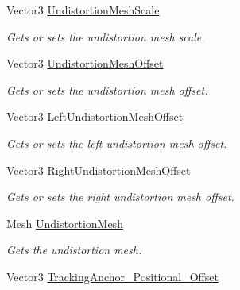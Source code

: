 \begin{DoxyCompactItemize}
Vector3 \mbox{\hyperlink{class_ximmerse_1_1_slide_in_s_d_k_1_1_override_a_r_setting_add01e612d5545552a7ac20c6e5a3d6d2}{Undistortion\+Mesh\+Scale}}
\begin{DoxyCompactList}\small\item\em Gets or sets the undistortion mesh scale. \end{DoxyCompactList}\item 
Vector3 \mbox{\hyperlink{class_ximmerse_1_1_slide_in_s_d_k_1_1_override_a_r_setting_a1272dfacf5297297d593c3b99c45382a}{Undistortion\+Mesh\+Offset}}
\begin{DoxyCompactList}\small\item\em Gets or sets the undistortion mesh offset. \end{DoxyCompactList}\item 
Vector3 \mbox{\hyperlink{class_ximmerse_1_1_slide_in_s_d_k_1_1_override_a_r_setting_aa6049c4f0d6d97e81679712b3b0f0798}{Left\+Undistortion\+Mesh\+Offset}}
\begin{DoxyCompactList}\small\item\em Gets or sets the left undistortion mesh offset. \end{DoxyCompactList}\item 
Vector3 \mbox{\hyperlink{class_ximmerse_1_1_slide_in_s_d_k_1_1_override_a_r_setting_a7d8a158c270ce9232ae10b8a32caa906}{Right\+Undistortion\+Mesh\+Offset}}
\begin{DoxyCompactList}\small\item\em Gets or sets the right undistortion mesh offset. \end{DoxyCompactList}\item 
Mesh \mbox{\hyperlink{class_ximmerse_1_1_slide_in_s_d_k_1_1_override_a_r_setting_aade656ae4ccf5e5cfa539b413c61c1dd}{Undistortion\+Mesh}}
\begin{DoxyCompactList}\small\item\em Gets the undistortion mesh. \end{DoxyCompactList}\item 
Vector3 \mbox{\hyperlink{class_ximmerse_1_1_slide_in_s_d_k_1_1_override_a_r_setting_ad07a6e5cec0a4f024e1c485e438cd920}{Tracking\+Anchor\+\_\+\+Positional\+\_\+\+Offset}}

\end{DoxyCompactItemize}

